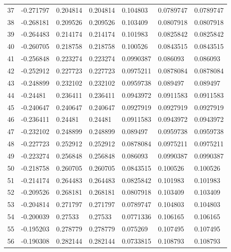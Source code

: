\begin{longtable}{l|lll|lll}
  37 & -0.271797    & 0.204814    & 0.204814    &  0.104803    & 0.0789747   & 0.0789747   \\
  38 & -0.268181    & 0.209526    & 0.209526    &  0.103409    & 0.0807918   & 0.0807918   \\
  39 & -0.264483    & 0.214174    & 0.214174    &  0.101983    & 0.0825842   & 0.0825842   \\
  40 & -0.260705    & 0.218758    & 0.218758    &  0.100526    & 0.0843515   & 0.0843515   \\
  41 & -0.256848    & 0.223274    & 0.223274    &  0.0990387   & 0.086093    & 0.086093    \\
  42 & -0.252912    & 0.227723    & 0.227723    &  0.0975211   & 0.0878084   & 0.0878084   \\
  43 & -0.248899    & 0.232102    & 0.232102    &  0.0959738   & 0.089497    & 0.089497    \\
  44 & -0.24481     & 0.236411    & 0.236411    &  0.0943972   & 0.0911583   & 0.0911583   \\
  45 & -0.240647    & 0.240647    & 0.240647    &  0.0927919   & 0.0927919   & 0.0927919   \\
  46 & -0.236411    & 0.24481     & 0.24481     &  0.0911583   & 0.0943972   & 0.0943972   \\
  47 & -0.232102    & 0.248899    & 0.248899    &  0.089497    & 0.0959738   & 0.0959738   \\
  48 & -0.227723    & 0.252912    & 0.252912    &  0.0878084   & 0.0975211   & 0.0975211   \\
  49 & -0.223274    & 0.256848    & 0.256848    &  0.086093    & 0.0990387   & 0.0990387   \\
  50 & -0.218758    & 0.260705    & 0.260705    &  0.0843515   & 0.100526    & 0.100526    \\
  51 & -0.214174    & 0.264483    & 0.264483    &  0.0825842   & 0.101983    & 0.101983    \\
  52 & -0.209526    & 0.268181    & 0.268181    &  0.0807918   & 0.103409    & 0.103409    \\
  53 & -0.204814    & 0.271797    & 0.271797    &  0.0789747   & 0.104803    & 0.104803    \\
  54 & -0.200039    & 0.27533     & 0.27533     &  0.0771336   & 0.106165    & 0.106165    \\
  55 & -0.195203    & 0.278779    & 0.278779    &  0.075269    & 0.107495    & 0.107495    \\
  56 & -0.190308    & 0.282144    & 0.282144    &  0.0733815   & 0.108793    & 0.108793    \\

\end{longtable}
